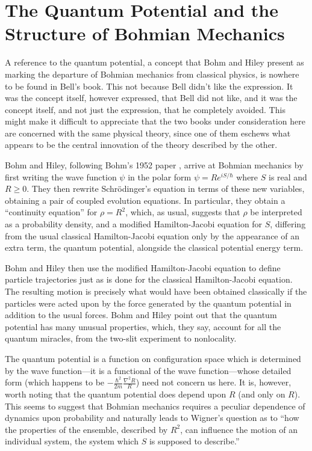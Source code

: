 \documentclass[12pt]{article}
\begin{document}
\section{The Quantum Potential and the Structure of Bohmian Mechanics}

A reference to the quantum potential, a concept that Bohm and Hiley present
as marking the departure of Bohmian mechanics from classical physics, is
nowhere to be found in Bell's book. This not because Bell didn't like the
expression. It was the concept itself, however expressed, that Bell did not
like, and it was the concept itself, and not just the expression, that he
completely avoided.  This might make it difficult  to appreciate
that the two books under consideration here are concerned with the same
physical theory, since one of them eschews what appears to be the central
innovation of the theory described by the other.

Bohm and Hiley, following Bohm's 1952 paper \cite{Bohm52}, arrive at
Bohmian mechanics by first writing the wave function $\psi$ in the polar
form $\psi=Re^{iS/\hbar}$ where $S$ is real and $R\ge 0$. They then rewrite
Schr\"odinger's equation in terms of these new variables, obtaining a pair
of coupled evolution equations. In particular, they obtain a ``continuity
equation'' for $\rho=R^2$, which, as usual, suggests that $\rho$ be
interpreted as a probability density, and a modified Hamilton-Jacobi
equation for $S$, differing from the usual classical Hamilton-Jacobi
equation only by the appearance of an extra term, the quantum potential,
alongside the classical potential energy term.

Bohm and Hiley then use the modified Hamilton-Jacobi equation to define
particle trajectories just as is done for the classical Hamilton-Jacobi
equation. The resulting motion is precisely what would have been obtained
classically if the particles were acted upon by the force generated by the
quantum potential in addition to the usual forces. Bohm and Hiley point out
that the quantum potential has many unusual properties, which, they say,
account for all the quantum miracles, from the two-slit experiment to
nonlocality.

The quantum potential is a function on configuration space which is
determined by the wave function---it is a functional of the wave
function---whose detailed form (which happens to be
$-\frac{\hbar^2}{2m}\frac{\nabla^2R}{R}$) need not concern us here. It is,
however, worth noting that the quantum potential does depend upon $R$ (and
only on $R$). This seems to suggest that Bohmian mechanics requires a
peculiar dependence of dynamics upon probability and naturally leads to
Wigner's question \cite[page 290]{Wigner1} as to ``how the properties of
the ensemble, described by $R^2$, can influence the motion of an individual
system, the system which $S$ is supposed to describe.''
\end{document}
